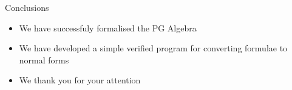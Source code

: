 \documentclass[12pt]{beamer}
\begin{document}
\begin{frame}{Conclusions}

\begin{itemize}
\item We have successfuly formalised the PG Algebra
\item We have developed a simple verified program for converting formulae to normal forms
\item We thank you for your attention
\end{itemize}

\end{frame}
\end{document}
